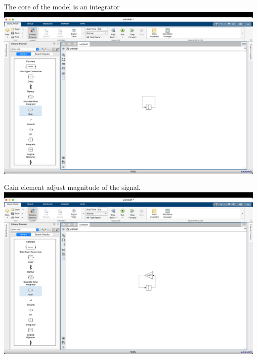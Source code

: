 \begin{frame}{The core of the model is an integrator}
    \hspace*{-11mm}
    \includegraphics[width=\paperwidth]{lesson_2/images/simulink_screen_18.png}
\end{frame}

\begin{frame}{Gain element adjust magnitude of the signal.}
    \hspace*{-11mm}
    \includegraphics[width=\paperwidth]{lesson_2/images/simulink_screen_20.png}
\end{frame}

